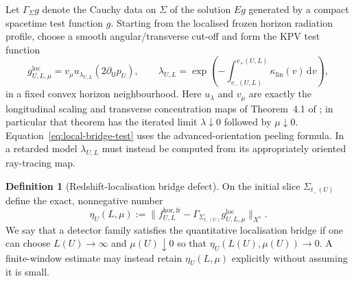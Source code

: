 \documentclass[11pt,a4paper]{article}
\theoremstyle{definition}
\newtheorem{definition}[theorem]{Definition}
\theoremstyle{remark}
\newcommand{\dd}{\mathrm d}
\begin{document}
	Let $\Gamma_\Sigma g$ denote the Cauchy data on $\Sigma$ of the solution
	$Eg$ generated by a compact spacetime test function $g$.  Starting from the
	localised frozen horizon radiation profile, choose a smooth
	angular/transverse cut-off and form the KPV test function
	\begin{equation}
		g^{\mathrm{loc}}_{U,L,\mu}
		=v_\mu u_{\lambda_{U,L}}
		(2\partial_{\mathsf U}p_U),
		\qquad
		\lambda_{U,L}=\exp\!\left(-\int_{v_-(U,L)}^{v_+(U,L)}
		\kappa_{\mathrm{lin}}(v)\,\dd v\right),
		\label{eq:local-bridge-test}
	\end{equation}
	in a fixed convex horizon neighbourhood.  Here $u_\lambda$ and $v_\mu$ are
	exactly the longitudinal scaling and transverse concentration maps of
	Theorem~4.1 of \cite{KurpiczPinamontiVerch2021}; in particular that theorem
	has the iterated limit $\lambda\downarrow0$ followed by $\mu\downarrow0$.
	Equation~\eqref{eq:local-bridge-test} uses the advanced-orientation peeling
	formula.  In a retarded model $\lambda_{U,L}$ must instead be computed from
	its appropriately oriented ray-tracing map.
	
	\begin{definition}[Redshift-localisation bridge defect]
		\label{ass:localisation-bridge}
		On the initial slice $\Sigma_{t_-(U)}$ define the exact, nonnegative number
		\begin{equation}
			\eta_U(L,\mu):=
			\bigl\|f^{\mathrm{hor,fr}}_{U,L}
			-\Gamma_{\Sigma_{t_-(U)}}g^{\mathrm{loc}}_{U,L,\mu}\bigr\|_{X^s}.
			\label{eq:bridge-defect}
		\end{equation}
		We say that a detector family satisfies the quantitative localisation bridge
		if one can choose $L(U)\to\infty$ and $\mu(U)\downarrow0$ so that
		$\eta_U(L(U),\mu(U))\to0$.  A finite-window estimate may instead retain
		$\eta_U(L,\mu)$ explicitly without assuming it is small.
	\end{definition}
	
\end{document}
